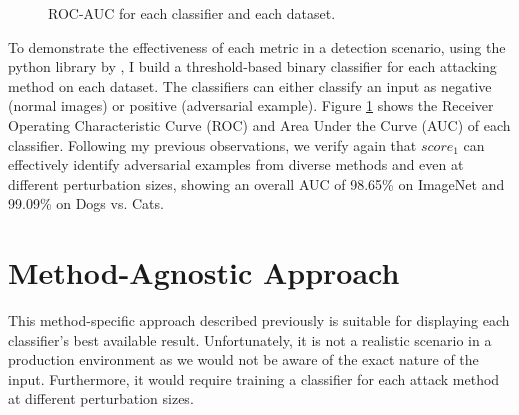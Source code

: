\begin{figure}[htp]
    \caption{ROC-AUC for each classifier and each dataset.}
    \label{fig:rocs}
\end{figure}

To demonstrate the effectiveness of each metric in a detection scenario, using
the python library by \cite{buitinck_api_2013}, I build a threshold-based binary
classifier for each attacking method on each dataset. The classifiers can either
classify an input as negative (normal images) or positive (adversarial example).
Figure \ref{fig:rocs} shows the Receiver Operating Characteristic Curve (ROC)
and Area Under the Curve (AUC) of each classifier. Following my previous
observations, we verify again that $score_1$ can effectively identify
adversarial examples from diverse methods and even at different perturbation
sizes, showing an overall AUC of 98.65\% on ImageNet and 99.09\% on Dogs vs.
Cats.

\section{Method-Agnostic Approach}
This method-specific approach described previously is suitable for displaying
each classifier's best available result. Unfortunately, it is not a realistic
scenario in a production environment as we would not be aware of the exact
nature of the input. Furthermore, it would require training a classifier for
each attack method at different perturbation sizes.

